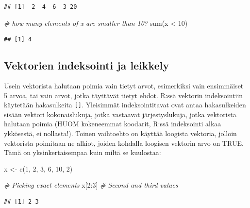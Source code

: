\documentclass[
]{book}
\newenvironment{Shaded}{\begin{snugshade}}{\end{snugshade}}
\newcommand{\CommentTok}[1]{\textcolor[rgb]{0.56,0.35,0.01}{\textit{#1}}}
\newcommand{\DecValTok}[1]{\textcolor[rgb]{0.00,0.00,0.81}{#1}}
\newcommand{\FunctionTok}[1]{\textcolor[rgb]{0.00,0.00,0.00}{#1}}
\newcommand{\NormalTok}[1]{#1}
\newcommand{\OtherTok}[1]{\textcolor[rgb]{0.56,0.35,0.01}{#1}}
\newcommand{\SpecialCharTok}[1]{\textcolor[rgb]{0.00,0.00,0.00}{#1}}
\begin{document}
\begin{verbatim}
## [1]  2  4  6  3 20
\end{verbatim}

\begin{Shaded}
\begin{Highlighting}[]
\CommentTok{\# how many elements of x are smaller than 10?}
\FunctionTok{sum}\NormalTok{(x }\SpecialCharTok{\textless{}} \DecValTok{10}\NormalTok{)}
\end{Highlighting}
\end{Shaded}

\begin{verbatim}
## [1] 4
\end{verbatim}

\hypertarget{vektorien-indeksointi-ja-leikkely}{%
\subsection{Vektorien indeksointi ja leikkely}\label{vektorien-indeksointi-ja-leikkely}}

Usein vektorista halutaan poimia vain tietyt arvot, esimerkiksi vain ensimmäiset 5 arvoa, tai vain arvot, jotka täyttävät tietyt ehdot. R:ssä vektorin indeksointiin käytetään hakasulkeita \texttt{{[}{]}}. Yleisimmät indeksointitavat ovat antaa hakasulkeiden sisään vektori kokonaislukuja, jotka vastaavat järjestyslukuja, jotka vektorista halutaan poimia (HUOM kokeneemmat koodarit, R:ssä indeksointi alkaa ykkösestä, ei nollasta!). Toinen vaihtoehto on käyttää loogista vektoria, jolloin vektorista poimitaan ne alkiot, joiden kohdalla loogisen vektorin arvo on TRUE. Tämä on yksinkertaisempaa kuin miltä se kuulostaa:

\begin{Shaded}
\begin{Highlighting}[]
\NormalTok{x }\OtherTok{\textless{}{-}} \FunctionTok{c}\NormalTok{(}\DecValTok{1}\NormalTok{, }\DecValTok{2}\NormalTok{, }\DecValTok{3}\NormalTok{, }\DecValTok{6}\NormalTok{, }\DecValTok{10}\NormalTok{, }\DecValTok{2}\NormalTok{)}

\CommentTok{\# Picking exact elements}
\NormalTok{x[}\DecValTok{2}\SpecialCharTok{:}\DecValTok{3}\NormalTok{] }\CommentTok{\# Second and third values}
\end{Highlighting}
\end{Shaded}

\begin{verbatim}
## [1] 2 3
\end{verbatim}
\end{document}
